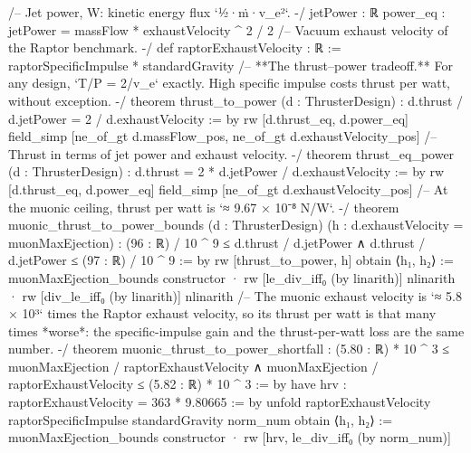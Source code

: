 \documentclass[11pt,a4paper]{article}
\begin{document}
{  /-- Jet power, W: kinetic energy flux `½·ṁ·v\_\allowbreak{}e²`. -/
  jetPower : ℝ
  power\_\allowbreak{}eq : jetPower = massFlow * exhaustVelocity \textasciicircum{} 2 / 2
\mbox{}
/-- Vacuum exhaust velocity of the Raptor benchmark. -/
def raptorExhaustVelocity : ℝ := raptorSpecificImpulse * standardGravity
\mbox{}
/-- **The thrust–power tradeoff.**  For any design, `T/P = 2/v\_\allowbreak{}e` exactly.  High
specific impulse costs thrust per watt, without exception. -/
theorem thrust\_\allowbreak{}to\_\allowbreak{}power (d : ThrusterDesign) :
    d.thrust / d.jetPower = 2 / d.exhaustVelocity := by
  rw [d.thrust\_\allowbreak{}eq, d.power\_\allowbreak{}eq]
  field\_\allowbreak{}simp [ne\_\allowbreak{}of\_\allowbreak{}gt d.massFlow\_\allowbreak{}pos, ne\_\allowbreak{}of\_\allowbreak{}gt d.exhaustVelocity\_\allowbreak{}pos]
\mbox{}
/-- Thrust in terms of jet power and exhaust velocity. -/
theorem thrust\_\allowbreak{}eq\_\allowbreak{}power (d : ThrusterDesign) :
    d.thrust = 2 * d.jetPower / d.exhaustVelocity := by
  rw [d.thrust\_\allowbreak{}eq, d.power\_\allowbreak{}eq]
  field\_\allowbreak{}simp [ne\_\allowbreak{}of\_\allowbreak{}gt d.exhaustVelocity\_\allowbreak{}pos]
\mbox{}
/-- At the muonic ceiling, thrust per watt is `≈ 9.67 × 10⁻⁸ N/W`. -/
theorem muonic\_\allowbreak{}thrust\_\allowbreak{}to\_\allowbreak{}power\_\allowbreak{}bounds (d : ThrusterDesign)
    (h : d.exhaustVelocity = muonMaxEjection) :
    (96 : ℝ) / 10 \textasciicircum{} 9 ≤ d.thrust / d.jetPower ∧
      d.thrust / d.jetPower ≤ (97 : ℝ) / 10 \textasciicircum{} 9 := by
  rw [thrust\_\allowbreak{}to\_\allowbreak{}power, h]
  obtain ⟨h₁, h₂⟩ := muonMaxEjection\_\allowbreak{}bounds
  constructor
  · rw [le\_\allowbreak{}div\_\allowbreak{}iff₀ (by linarith)]
    nlinarith
  · rw [div\_\allowbreak{}le\_\allowbreak{}iff₀ (by linarith)]
    nlinarith
\mbox{}
/-- The muonic exhaust velocity is `≈ 5.8 × 10³` times the Raptor exhaust
velocity, so its thrust per watt is that many times *worse*: the specific-impulse
gain and the thrust-per-watt loss are the same number. -/
theorem muonic\_\allowbreak{}thrust\_\allowbreak{}to\_\allowbreak{}power\_\allowbreak{}shortfall :
    (5.80 : ℝ) * 10 \textasciicircum{} 3 ≤ muonMaxEjection / raptorExhaustVelocity ∧
      muonMaxEjection / raptorExhaustVelocity ≤ (5.82 : ℝ) * 10 \textasciicircum{} 3 := by
  have hrv : raptorExhaustVelocity = 363 * 9.80665 := by
    unfold raptorExhaustVelocity raptorSpecificImpulse standardGravity
    norm\_\allowbreak{}num
  obtain ⟨h₁, h₂⟩ := muonMaxEjection\_\allowbreak{}bounds
  constructor
  · rw [hrv, le\_\allowbreak{}div\_\allowbreak{}iff₀ (by norm\_\allowbreak{}num)]
}
\end{document}
